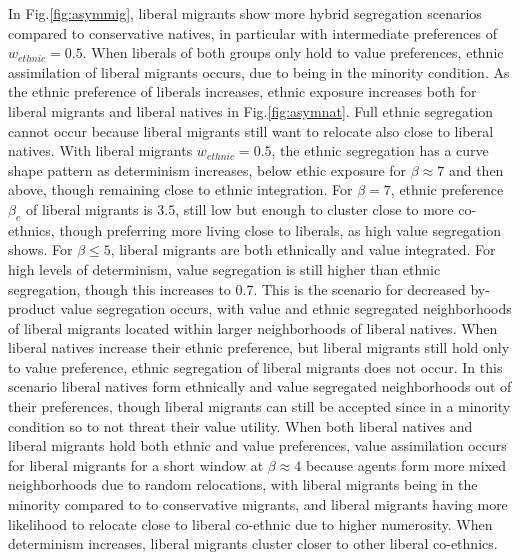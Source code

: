 \documentclass[
]{article}
\begin{document}
In Fig.\ref{fig:asymmig}, liberal migrants show more hybrid segregation scenarios compared to conservative natives, in particular with intermediate preferences of $w_{ethnic} = 0.5$. When liberals of both groups only hold to value preferences, ethnic assimilation of liberal migrants occurs, due to being in the minority condition. As the ethnic preference of liberals increases, ethnic exposure increases both for liberal migrants and liberal natives in Fig.\ref{fig:asymnat}. Full ethnic segregation cannot occur because liberal migrants still want to relocate also close to liberal natives. With liberal migrants $w_{ethnic} = 0.5$, the ethnic segregation has a curve shape pattern as determinism increases, below ethic exposure for $\beta \approx 7$ and then above, though remaining close to ethnic integration. For $\beta = 7$, ethnic preference $\beta_{e}$ of liberal migrants is $3.5$, still low but enough to cluster close to more co-ethnics, though preferring more living close to liberals, as high value segregation shows. For $\beta \leq 5$, liberal migrants are both ethnically and value integrated. For high levels of determinism, value segregation is still higher than ethnic segregation, though this increases to 0.7. This is the scenario for decreased by-product value segregation occurs, with value and ethnic segregated neighborhoods of liberal migrants located within larger neighborhoods of liberal natives. When liberal natives increase their ethnic preference, but liberal migrants still hold only to value preference, ethnic segregation of liberal migrants does not occur. In this scenario liberal natives form ethnically and value segregated neighborhoods out of their preferences, though liberal migrants can still be accepted since in a minority condition so to not threat their value utility. When both liberal natives and liberal migrants hold both ethnic and value preferences, value assimilation occurs for liberal migrants for a short window at $\beta \approx 4$ because agents form more mixed neighborhoods due to random relocations, with liberal migrants being in the minority compared to to conservative migrants, and liberal migrants having more likelihood to relocate close to liberal co-ethnic due to higher numerosity. When determinism increases, liberal migrants cluster closer to other liberal co-ethnics.
\end{document}

